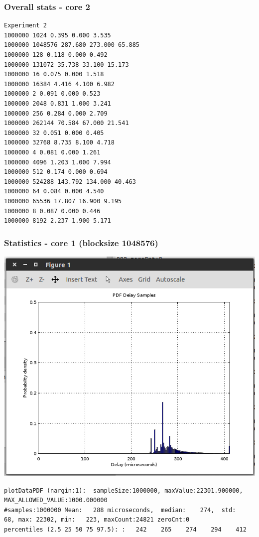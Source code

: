 \documentclass{article}
\begin{document}
\subsubsection{Overall stats - core 2}

\begin{lstlisting}
Experiment 2
1000000 1024 0.395 0.000 3.535
1000000 1048576 287.680 273.000 65.885
1000000 128 0.118 0.000 0.492
1000000 131072 35.738 33.100 15.173
1000000 16 0.075 0.000 1.518
1000000 16384 4.416 4.100 6.982
1000000 2 0.091 0.000 0.523
1000000 2048 0.831 1.000 3.241
1000000 256 0.284 0.000 2.709
1000000 262144 70.584 67.000 21.541
1000000 32 0.051 0.000 0.405
1000000 32768 8.735 8.100 4.718
1000000 4 0.081 0.000 1.261
1000000 4096 1.203 1.000 7.994
1000000 512 0.174 0.000 0.694
1000000 524288 143.792 134.000 40.463
1000000 64 0.084 0.000 4.540
1000000 65536 17.807 16.900 9.195
1000000 8 0.087 0.000 0.446
1000000 8192 2.237 1.900 5.171
\end{lstlisting}

\subsubsection{Statistics - core 1 (blocksize 1048576)}

\includegraphics{q3/exp2/core1}

\begin{lstlisting}
plotDataPDF (nargin:1):  sampleSize:1000000, maxValue:22301.900000,  MAX_ALLOWED_VALUE:1000.000000
#samples:1000000 Mean:   288 microseconds,  median:    274,  std:     68, max: 22302, min:   223, maxCount:24821 zeroCnt:0
percentiles (2.5 25 50 75 97.5): :   242    265    274    294    412
\end{lstlisting}
\end{document}
